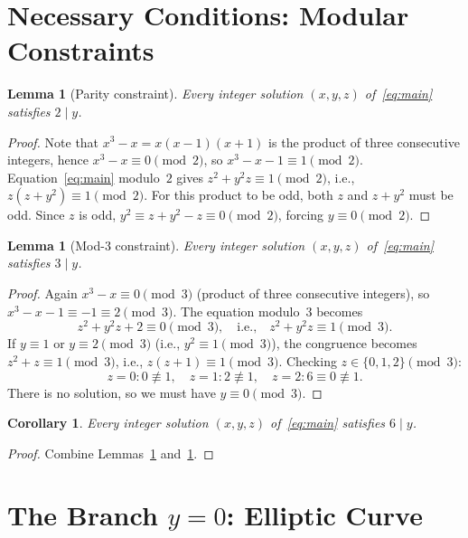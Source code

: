 \documentclass[12pt,a4paper]{article}
\newtheorem{lemma}[theorem]{Lemma}
\newtheorem{corollary}[theorem]{Corollary}
\theoremstyle{definition}
\begin{document}
\section{Necessary Conditions: Modular Constraints}
\label{sec:modular}

\begin{lemma}[Parity constraint]\label{lem:mod2}
  Every integer solution $(x,y,z)$ of~\eqref{eq:main} satisfies $2\mid y$.
\end{lemma}
\begin{proof}
  Note that $x^3 - x = x(x-1)(x+1)$ is the product of three consecutive
  integers, hence $x^3-x\equiv 0\pmod{2}$, so $x^3-x-1\equiv 1\pmod 2$.
  Equation~\eqref{eq:main} modulo~$2$ gives $z^2 + y^2 z \equiv 1\pmod 2$,
  i.e., $z(z+y^2)\equiv 1\pmod 2$.  For this product to be odd, both $z$ and
  $z+y^2$ must be odd.  Since $z$ is odd, $y^2\equiv z+y^2 - z \equiv 0 \pmod 2$,
  forcing $y\equiv 0\pmod 2$.
\end{proof}

\begin{lemma}[Mod-3 constraint]\label{lem:mod3}
  Every integer solution $(x,y,z)$ of~\eqref{eq:main} satisfies $3\mid y$.
\end{lemma}
\begin{proof}
  Again $x^3-x\equiv 0\pmod 3$ (product of three consecutive integers), so
  $x^3-x-1\equiv -1\equiv 2\pmod 3$.  The equation modulo~$3$ becomes
  \[
    z^2 + y^2 z + 2 \equiv 0 \pmod 3,
    \quad\text{i.e.,}\quad
    z^2 + y^2 z \equiv 1 \pmod 3.
  \]
  If $y\equiv 1$ or $y\equiv 2\pmod 3$ (i.e., $y^2\equiv 1\pmod 3$), the
  congruence becomes $z^2+z\equiv 1\pmod 3$, i.e., $z(z+1)\equiv 1\pmod 3$.
  Checking $z\in\{0,1,2\}\pmod 3$:
  \[
    z=0: 0\not\equiv 1,\quad z=1: 2\not\equiv 1,\quad z=2: 6\equiv 0\not\equiv 1.
  \]
  There is no solution, so we must have $y\equiv 0\pmod 3$.
\end{proof}

\begin{corollary}\label{cor:6divy}
  Every integer solution $(x,y,z)$ of~\eqref{eq:main} satisfies $6\mid y$.
\end{corollary}
\begin{proof}
  Combine Lemmas~\ref{lem:mod2} and~\ref{lem:mod3}.
\end{proof}

\section{The Branch \texorpdfstring{$y=0$}{y=0}: Elliptic Curve}
\label{sec:y0}
\end{document}
